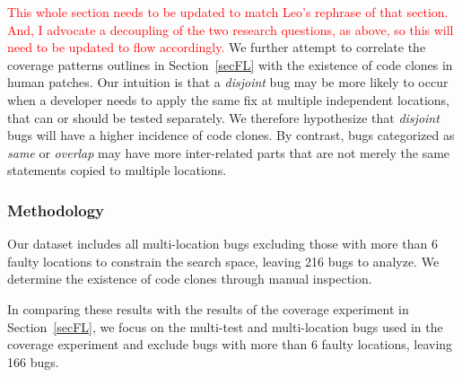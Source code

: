 \documentclass[10pt, conference]{IEEEtran}
\newcommand\todo[1]{\textcolor{red}{#1}}
\begin{document}
\todo{This whole section needs to be updated to match Leo's rephrase of that section.  And, I
  advocate a decoupling of the two research questions, as above, so this will
  need to be updated to flow accordingly.}
We further attempt to correlate the coverage patterns outlines in
Section~\ref{secFL} with the existence of code clones in human patches.  Our 
intuition is that a \emph{disjoint} bug may be more likely to occur when a
developer needs to apply the same fix at multiple independent locations, that
can or should be tested separately.  We therefore 
 hypothesize that \emph{disjoint} bugs will have a higher incidence of code
clones. By contrast, bugs categorized as \emph{same} or \emph{overlap} may have
more inter-related parts that are not merely the same statements copied to
multiple locations.


\subsubsection{Methodology}
\label{sec52}%
Our dataset includes all multi-location bugs excluding those with more than 6 faulty locations to 
constrain the search space, leaving 216 bugs to analyze. We determine the existence of code 
clones through manual inspection.


In comparing these results with the results of the coverage experiment in
Section~\ref{secFL}, we focus on the multi-test and multi-location bugs used in the coverage 
experiment and exclude bugs with more than 6 faulty locations, leaving 166 bugs.
\end{document}
